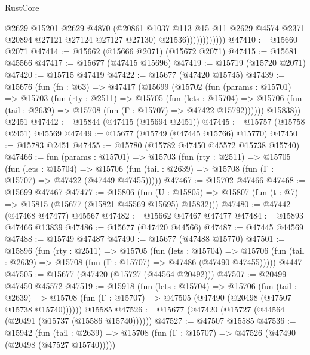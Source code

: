 \begin{lexlean}{RustCore}
\begin{coremodule}
                            @2629
                            @15201
                            @2629
                            @4870
                            (@20861
                              @1037
                              @113
                              @15
                              @11
                              @2629
                              @4574
                              @2371
                              @20894
                              @27121
                              @27124
                              @27127
                              @27130)
                            @21536))))))))))))
@47410 := @15660 @2071
@47414 := @15662 (@15666 @2071) (@15672 @2071)
@47415 := @15681 @45566
@47417 := @15677 (@47415 @15696)
@47419 := @15719 (@15720 @2071)
@47420 := @15715 @47419
@47422 := @15677 (@47420 @15745)
@47439 := @15676
    (fun (fn : @63) =>
    @47417
      (@15699
        (@15702
          (fun (params : @15701) =>
          @15703
            (fun (rty : @2511) =>
            @15705
              (fun (lets : @15704) =>
              @15706 (fun (tail : @2639) => @15708 (fun (Γ : @15707) => @47422 @15792))))))
        @15838))
    @2451
@47442 := @15844 (@47415 (@15694 @2451))
@47445 := @15757 (@15758 @2451) @45569
@47449 := @15677 (@15749 (@47445 @15766) @15770)
@47450 := @15783 @2451
@47455 := @15780 (@15782 @47450 @45572 @15738 @15740)
@47466 := fun (params : @15701) =>
  @15703
    (fun (rty : @2511) =>
    @15705
      (fun (lets : @15704) =>
      @15706 (fun (tail : @2639) => @15708 (fun (Γ : @15707) => @47422 (@47449 @47455)))))
@47467 := @15702 @47466
@47468 := @15699 @47467
@47477 := @15806
    (fun (U : @15805) => @15807 (fun (t : @7) => @15815 (@15677 (@15821 @45569 @15695) @15832)))
@47480 := @47442 (@47468 @47477) @45567
@47482 := @15662 @47467 @47477
@47484 := @15893 @47466 @13839
@47486 := @15677 (@47420 @44566)
@47487 := @47445 @44569
@47488 := @15749 @47487
@47490 := @15677 (@47488 @15770)
@47501 := @15896
    (fun (rty : @2511) =>
    @15705
      (fun (lets : @15704) =>
      @15706 (fun (tail : @2639) => @15708 (fun (Γ : @15707) => @47486 (@47490 @47455)))))
    @4447
@47505 := @15677 (@47420 (@15727 (@44564 @20492)))
@47507 := @20499 @47450 @45572
@47519 := @15918
    (fun (lets : @15704) =>
    @15706
      (fun (tail : @2639) =>
      @15708 (fun (Γ : @15707) => @47505 (@47490 (@20498 (@47507 @15738 @15740))))))
    @15585
@47526 := @15677 (@47420 (@15727 (@44564 (@20491 (@15737 (@15586 @15740))))))
@47527 := @47507 @15585
@47536 := @15942
    (fun (tail : @2639) => @15708 (fun (Γ : @15707) => @47526 (@47490 (@20498 (@47527 @15740)))))

\end{coremodule}
\end{lexlean}
